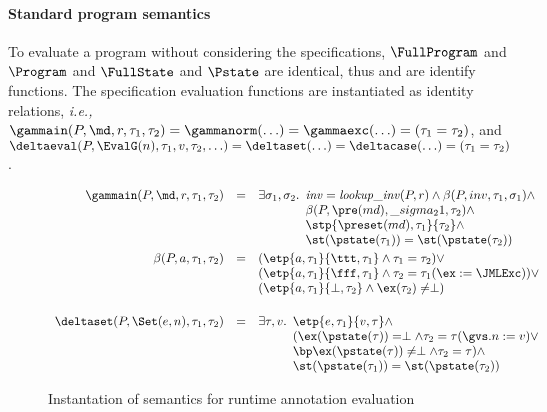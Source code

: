 \paragraph{Standard program semantics}
To evaluate a program without considering the specifications, 
\(\FullProgram\) and \(\Program\) and
\(\FullState\) and \(\Pstate\) are identical, thus \program and
\progstate are identify functions. The specification evaluation
functions are instantiated as identity relations, \emph{i.e.,}
\(\gammain(P, \md, r, \tau_1, \tau_2) = \gammanorm(\ldots) =
\gammaexc(\ldots) = (\tau_1 = \tau_2)\), and \(\deltaeval(P,
\EvalG(n), \tau_1, v, \tau_2, \ldots) = \deltaset(\ldots) = \deltacase(\ldots) = (\tau_1 =
\tau_2)\).  

\begin{figure}[t]
\[
\begin{array}{rcl}
\gammain(P, \md, r, \tau_1, \tau_2) & = & 
\exists \sigma_1, \sigma_2.
\begin{array}[t]{l}
\mathit{inv} = \mathit{lookup\_inv}(P, r) \wedge 
\beta(P, inv, \tau_1, \sigma_1) \wedge \\
\beta(P, \pre(md), \_sigma_21, \tau_2) \wedge\\
\stp{\preset(md), \tau_1}{\tau_2} \wedge\\
\st(\pstate(\tau_1)) = \st(\pstate(\tau_2))
\end{array}
\smallskip\\

\beta(P, a, \tau_1, \tau_2) & = & 
(\etp{a, \tau_1}{\ttt, \tau_1} \wedge \tau_1 = \tau_2) \vee\\
&& (\etp{a, \tau_1}{\fff, \tau_1} \wedge \tau_2 = \tau_1(\ex :=
\JMLExc))\vee\\
&& (\etp{a, \tau_1}{\perp, \tau_2} \wedge \ex(\tau_2) \not= \perp)\\
\smallskip\\

\deltaset(P, \Set(e, n), \tau_1, \tau_2) & = & 
\exists \tau, v. 
\begin{array}[t]{l}
\etp{e, \tau_1}{v, \tau} \wedge\\
(\ex(\pstate(\tau)) = \perp \wedge \tau_2 = \tau (\gvs.n := v) \vee\\
\bp \ex(\pstate(\tau)) \not= \perp \wedge \tau_2 = \tau) \wedge\\
\st(\pstate(\tau_1)) = \st(\pstate(\tau_2))
\end{array}
\\
\end{array}
\]
\caption{Instantation of semantics for runtime annotation evaluation}
\label{FigAnnotatedSem}
\end{figure}

